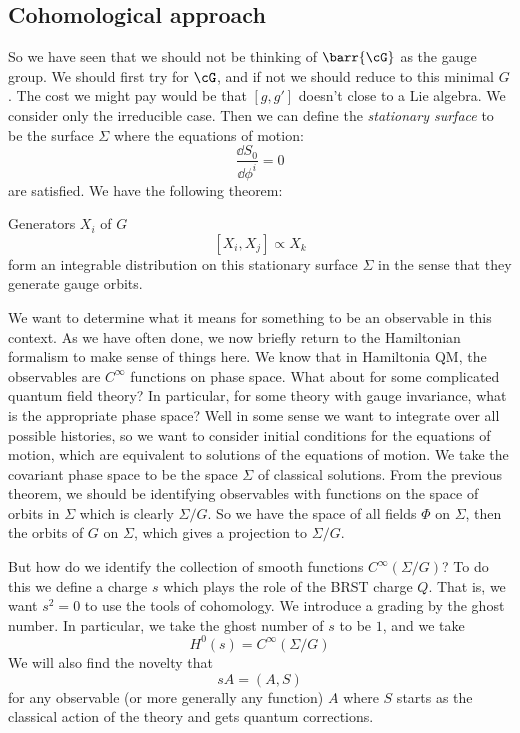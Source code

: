 \documentclass{booc}
\begin{document}
\subsection{Cohomological approach}

So we have seen that we should not be thinking of $\barr{\cG}$ as the gauge group.
We should first try for $\cG$, and if not we should reduce to this minimal $G$. 
The cost we might pay would be that
$\left[ g , g' \right]$ doesn't close to a Lie algebra.
We consider only the irreducible case.
Then we can define the \emph{stationary surface} to be the surface $\Sigma$
where the equations of motion:
\begin{equation}
\frac{\dd S_0}{\dd \phi^i} = 0
\end{equation}
are satisfied. 
We have the following theorem:

\begin{thm}
Generators $X_i$ of $G$
\begin{equation}
\left[ X_i , X_j \right] \propto X_k
\end{equation}
form an integrable distribution on this stationary surface $\Sigma$
in the sense that they generate gauge orbits.
\end{thm}

We want to determine what it means for something to be an observable in this context.
As we have often done, we now briefly return to the Hamiltonian formalism to make sense of things here. 
We know that in Hamiltonia QM, the observables are $C^\infty$ functions on phase space.
What about for some complicated quantum field theory?
In particular, for some theory with gauge invariance, what is the appropriate phase space?
Well in some sense we want to integrate over all possible histories, so we want 
to consider initial conditions for the equations of motion, which are equivalent to solutions
of the equations of motion. 
We take the covariant phase space to be the space $\Sigma$ of classical solutions. 
From the previous theorem, we should be identifying observables with functions on 
the space of orbits in $\Sigma$ which is clearly $\Sigma / G$.
So we have the space of all fields $\Phi$ on $\Sigma$, then the orbits of $G$ on $\Sigma$,
which gives a projection to $\Sigma / G$.

But how do we identify the collection of smooth functions $C^\infty\left( \Sigma / G \right)$?
To do this we define a charge $s$ which plays the role of the BRST charge $Q$. 
That is, we want $s^2 = 0$ to use the tools of cohomology. 
We introduce a grading by the ghost number. 
In particular, we take the ghost number of $s$ to be $1$, 
and we take
\begin{equation}
H^0\left( s \right) = C^\infty\left( \Sigma / G \right)
\end{equation}
We will also find the novelty that
\begin{equation}
sA = \left( A,S \right)
\end{equation}
for any observable (or more generally any function) $A$
where $S$ starts as the classical action of the theory and gets quantum corrections.
\end{document}
